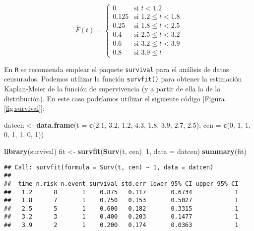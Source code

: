 \documentclass[
]{book}
\newenvironment{Shaded}{\begin{snugshade}}{\end{snugshade}}
\newcommand{\DataTypeTok}[1]{\textcolor[rgb]{0.13,0.29,0.53}{#1}}
\newcommand{\DecValTok}[1]{\textcolor[rgb]{0.00,0.00,0.81}{#1}}
\newcommand{\FloatTok}[1]{\textcolor[rgb]{0.00,0.00,0.81}{#1}}
\newcommand{\KeywordTok}[1]{\textcolor[rgb]{0.13,0.29,0.53}{\textbf{#1}}}
\newcommand{\NormalTok}[1]{#1}
\newcommand{\OperatorTok}[1]{\textcolor[rgb]{0.81,0.36,0.00}{\textbf{#1}}}
\newcommand{\StringTok}[1]{\textcolor[rgb]{0.31,0.60,0.02}{#1}}
\theoremstyle{definition}
\theoremstyle{definition}
\theoremstyle{definition}
\theoremstyle{remark}
\begin{document}
\[\hat{F}\left( t \right) =\left\{ 
\begin{array}{ll}
0& \text{si } t<1.2 \\ 
0.125& \text{si } 1.2\leq t<1.8 \\ 
0.25& \text{si } 1.8\leq t<2.5 \\ 
0.4& \text{si } 2.5\leq t<3.2 \\ 
0.6& \text{si } 3.2\leq t<3.9 \\ 
0.8& \text{si } 3.9\leq t
\end{array}
\right.\]

En \texttt{R} se recomienda emplear el paquete \texttt{survival} para el análisis de
datos censurados. Podemos utilizar la función \texttt{survfit()} para obtener
la estimación Kaplan-Meier de la función de supervivencia
(y a partir de ella la de la distribución).
En este caso podríamos utilizar el siguiente código {[}Figura \ref{fig:survival}{]}:

\begin{Shaded}
\begin{Highlighting}[]
\NormalTok{datcen <-}\StringTok{ }\KeywordTok{data.frame}\NormalTok{(}\DataTypeTok{t =} \KeywordTok{c}\NormalTok{(}\FloatTok{2.1}\NormalTok{, }\FloatTok{3.2}\NormalTok{, }\FloatTok{1.2}\NormalTok{, }\FloatTok{4.3}\NormalTok{, }\FloatTok{1.8}\NormalTok{, }\FloatTok{3.9}\NormalTok{, }\FloatTok{2.7}\NormalTok{, }\FloatTok{2.5}\NormalTok{), }
                 \DataTypeTok{cen =} \KeywordTok{c}\NormalTok{(}\DecValTok{0}\NormalTok{, }\DecValTok{1}\NormalTok{, }\DecValTok{1}\NormalTok{, }\DecValTok{0}\NormalTok{, }\DecValTok{1}\NormalTok{, }\DecValTok{1}\NormalTok{, }\DecValTok{0}\NormalTok{, }\DecValTok{1}\NormalTok{))}

\KeywordTok{library}\NormalTok{(survival)}
\NormalTok{fit <-}\StringTok{ }\KeywordTok{survfit}\NormalTok{(}\KeywordTok{Surv}\NormalTok{(t, cen)}\OperatorTok{~}\DecValTok{1}\NormalTok{, }\DataTypeTok{data =}\NormalTok{ datcen)}
\KeywordTok{summary}\NormalTok{(fit)}
\end{Highlighting}
\end{Shaded}

\begin{verbatim}
## Call: survfit(formula = Surv(t, cen) ~ 1, data = datcen)
## 
##  time n.risk n.event survival std.err lower 95% CI upper 95% CI
##   1.2      8       1    0.875   0.117       0.6734            1
##   1.8      7       1    0.750   0.153       0.5027            1
##   2.5      5       1    0.600   0.182       0.3315            1
##   3.2      3       1    0.400   0.203       0.1477            1
##   3.9      2       1    0.200   0.174       0.0363            1
\end{verbatim}
\end{document}
